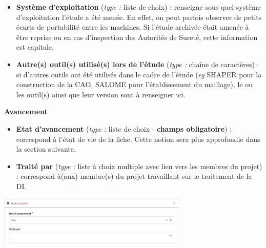 \begin{itemize}[label=$\Rightarrow$, font=\LARGE]
   \item \textbf{Système d'exploitation} (\textit{type :} liste de choix) : renseigne sous quel système d'exploitation l'étude a été menée. En effet, on peut parfois observer de petits écarts de portabilité entre les machines. Si l'étude archivée était amenée à être reprise ou en cas d'inspection des Autorités de Sureté, cette information est capitale.
   \item \textbf{Autre(s) outil(s) utilisé(s) lors de l'étude} (\textit{type :} chaîne de caractères) : si d'autres outils ont été utilisés dans le cadre de l'étude (\textit{eg} SHAPER pour la construction de la CAO, SALOME pour l'établissement du maillage), le ou les outil(s) ainsi que leur version sont à renseigner ici.
\end{itemize}

\vspace{0.5cm}

\begin{minipage}[c]{0.45\linewidth}
\textbf{Avancement}
\begin{itemize}[label=$\Rightarrow$, font=\LARGE]
   \item \textbf{Etat d'avancement} (\textit{type :} liste de choix - \textbf{champs obligatoire}) :  correspond à l'état de vie de la fiche. Cette notion sera plus approfondie dans la section suivante. 
   \item \textbf{Traité par} (\textit{type :} liste à choix multiple avec lien vers les membres du projet) : correspond à(aux) membre(s) du projet travaillant sur le traitement de la DI.
\end{itemize}

\end{minipage} \hfill
\begin{minipage}[c]{0.5\linewidth}
   \includegraphics[width=9cm]{pictures/GEA-avancement.png}\vspace*{0.2cm}

\end{minipage}

\vspace{0.5cm}

